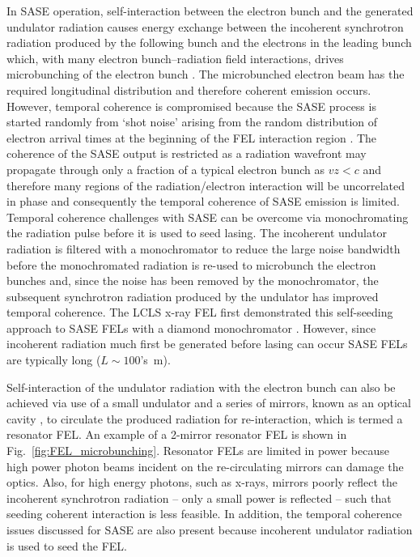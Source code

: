 \documentclass[../main.tex]{subfiles}
\begin{document}
In SASE operation, self-interaction between the electron bunch and the generated undulator radiation causes energy exchange between the incoherent synchrotron radiation produced by the following bunch and the electrons in the leading bunch which, with many electron bunch--radiation field interactions, drives microbunching of the electron bunch \cite{kondratenko1980generating,bonifacio1984collective}. The microbunched electron beam has the required longitudinal distribution and therefore coherent emission occurs. However, temporal coherence is compromised because the SASE process is started randomly from `shot noise' arising from the random distribution of
electron arrival times at the beginning of the FEL interaction region \cite{mcneil2003unified}. The coherence of the SASE output is restricted as a radiation wavefront may propagate through only a fraction of a typical electron bunch as $vz < c$ and therefore many regions of the radiation/electron interaction will be uncorrelated in phase \cite{thompson2010improved} and consequently the temporal coherence of SASE emission is limited. Temporal coherence challenges with SASE can be overcome via monochromating the radiation pulse before it is used to seed lasing. The incoherent undulator radiation is filtered with a monochromator to reduce the large noise bandwidth before the monochromated radiation is re-used to microbunch the electron bunches and, since the noise has been removed by the monochromator, the subsequent synchrotron radiation produced by the undulator has improved temporal coherence. The LCLS x-ray FEL first demonstrated this self-seeding approach to SASE FELs with a diamond monochromator \cite{emma2010first}. However, since incoherent radiation much first be generated before lasing can occur SASE FELs are typically long ($L\sim 100$'s~\si{\meter}).

Self-interaction of the undulator radiation with the electron bunch can also be achieved via use of a small undulator and a series of mirrors, known as an optical cavity \cite{petrillo2012photon}, to circulate the produced radiation for re-interaction, which is termed a resonator FEL. An example of a 2-mirror resonator FEL is shown in Fig.~\ref{fig:FEL_microbunching}. Resonator FELs are limited in power because high power photon beams incident on the re-circulating mirrors can damage the optics. Also, for high energy photons, such as x-rays, mirrors poorly reflect the incoherent synchrotron radiation -- only a small power is reflected -- such that seeding coherent interaction is less feasible. In addition, the temporal coherence issues discussed for SASE are also present because incoherent undulator radiation is used to seed the FEL.
\end{document}

